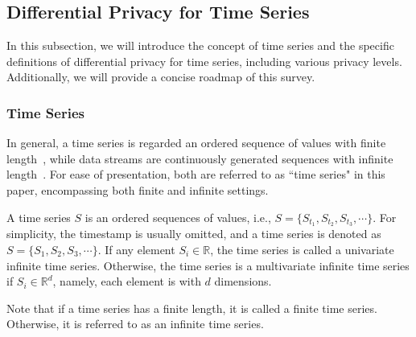 \subsection{Differential Privacy for Time Series}
In this subsection, we will introduce the concept of time series and the specific definitions of differential privacy for time series, including various privacy levels. Additionally, we will provide a concise roadmap of this survey.

\subsubsection{Time Series}
In general, a time series is regarded an ordered sequence of values with finite length~\cite{esling2012time}, while data streams are continuously generated sequences with infinite length~\cite{silva2013data}. For ease of presentation, both are referred to as ``time series" in this paper, encompassing both finite and infinite settings.

%	


\begin{definition} A time series $S$ is an ordered sequences of values, i.e., $S=\{S_{t_1}, S_{t_2}, S_{t_3}, \cdots\}$. For simplicity, the timestamp is usually omitted, and a time series is denoted as $S=\{S_{1}, S_{2}, S_{3}, \cdots\}$. If any element $S_i\in \mathbb{R}$, the time series is called a univariate infinite time series. Otherwise, the time series is a multivariate infinite time series if $S_i\in \mathbb{R}^d$, namely, each element is with $d$ dimensions.
\end{definition}

Note that if a time series has a finite length, it is called a finite time series. Otherwise, it is referred to as an infinite time series.


